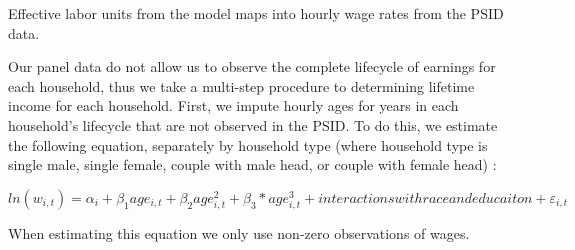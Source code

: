 \documentclass[article,11pt,letterpaper,fleqn]{article}
\theoremstyle{definition}
\numberwithin{equation}{section}
\begin{document}
Effective labor units from the model maps into hourly wage rates from the PSID data.

Our panel data do not allow us to observe the complete lifecycle of earnings for each household, thus we take a multi-step procedure to determining lifetime income for each household.  First, we impute hourly ages for years in each household's lifecycle that are not observed in the PSID.  To do this, we estimate the following equation, separately by household type (where household type is single male, single female, couple with male head, or couple with female head) :

\begin{equation}
ln(w_{i,t}) = \alpha_{i} + \beta_{1}age_{i,t} + \beta_{2}age_{i,t}^{2} + \beta_{3}*age_{i,t}^{3}+interactions with race and educaiton + \varepsilon_{i,t}
\end{equation}

When estimating this equation we only use non-zero observations of wages.


\end{document}

